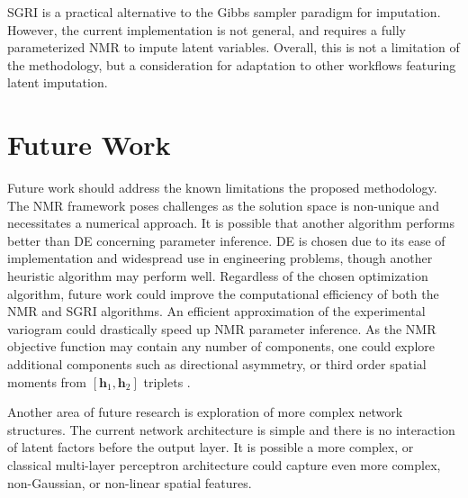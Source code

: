 \Gls{SGRI} is a practical alternative to the Gibbs sampler paradigm for imputation. However, the current implementation is not general, and requires a fully parameterized \gls{NMR} to impute latent variables. Overall, this is not a limitation of the methodology, but a consideration for adaptation to other workflows featuring latent imputation.


\FloatBarrier
\section{Future Work}
\label{sec:07fwork}

Future work should address the known limitations the proposed methodology. The \gls{NMR} framework poses challenges as the solution space is non-unique and necessitates a numerical approach. It is possible that another algorithm performs better than \gls{DE} concerning parameter inference. \Gls{DE} is chosen due to its ease of implementation and widespread use in engineering problems, though another heuristic algorithm may perform well. Regardless of the chosen optimization algorithm, future work could improve the computational efficiency of both the \gls{NMR} and \gls{SGRI} algorithms. An efficient approximation of the experimental variogram could drastically speed up \gls{NMR} parameter inference. As the \gls{NMR} objective function may contain any number of components, one could explore additional components such as directional asymmetry, or third order spatial moments from $[\mathbf{h}_{1}, \mathbf{h}_{2}]$ triplets \citep{lauzon2020sequential}.

Another area of future research is exploration of more complex network structures. The current network architecture is simple and there is no interaction of latent factors before the output layer. It is possible a more complex, or classical multi-layer perceptron architecture could capture even more complex, non-Gaussian, or non-linear spatial features.


